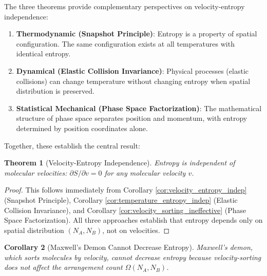 \documentclass[10pt,twocolumn,letterpaper]{article}
\newtheorem{theorem}{Theorem}[section]
\newtheorem{corollary}[theorem]{Corollary}
\theoremstyle{definition}
\theoremstyle{remark}
\newcommand{\Om}{\Omega}
\begin{document}
The three theorems provide complementary perspectives on velocity-entropy independence:

\begin{enumerate}
\item \textbf{Thermodynamic (Snapshot Principle)}: Entropy is a property of spatial configuration. The same configuration exists at all temperatures with identical entropy.

\item \textbf{Dynamical (Elastic Collision Invariance)}: Physical processes (elastic collisions) can change temperature without changing entropy when spatial distribution is preserved.

\item \textbf{Statistical Mechanical (Phase Space Factorization)}: The mathematical structure of phase space separates position and momentum, with entropy determined by position coordinates alone.
\end{enumerate}

Together, these establish the central result:

\begin{theorem}[Velocity-Entropy Independence]
\label{thm:main}
Entropy is independent of molecular velocities: $\partial S/\partial v = 0$ for any molecular velocity $v$.
\end{theorem}

\begin{proof}
This follows immediately from Corollary \ref{cor:velocity_entropy_indep} (Snapshot Principle), Corollary \ref{cor:temperature_entropy_indep} (Elastic Collision Invariance), and Corollary \ref{cor:velocity_sorting_ineffective} (Phase Space Factorization). All three approaches establish that entropy depends only on spatial distribution $(N_A, N_B)$, not on velocities.
\end{proof}

\begin{corollary}[Maxwell's Demon Cannot Decrease Entropy]
\label{cor:demon_fails}
Maxwell's demon, which sorts molecules by velocity, cannot decrease entropy because velocity-sorting does not affect the arrangement count $\Om(N_A, N_B)$.
\end{corollary}
\end{document}
